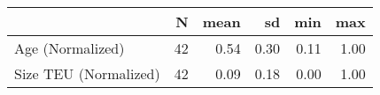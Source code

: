 
\begin{tabular}[t]{lrrrrr}
\toprule
  & N & mean & sd & min & max\\
\midrule
Age (Normalized) & 42 & 0.54 & 0.30 & 0.11 & 1.00\\
Size TEU (Normalized) & 42 & 0.09 & 0.18 & 0.00 & 1.00\\
\bottomrule
\end{tabular}
